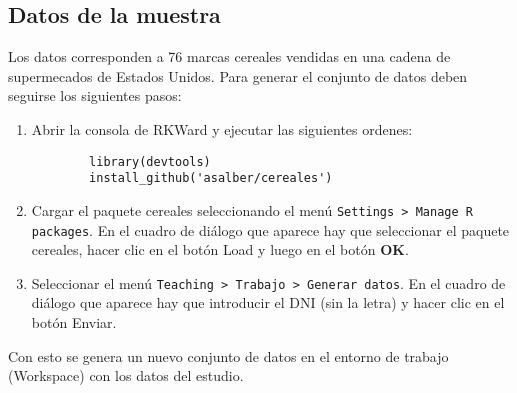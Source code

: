 \documentclass[a4paper,titlepage]{article}
\begin{document}
\subsection*{\color{blueceu}Datos de la muestra}
Los datos corresponden a 76 marcas cereales vendidas en una cadena de supermecados de Estados Unidos.
Para generar el conjunto de datos deben seguirse los siguientes pasos:
\begin{enumerate}
	\item Abrir la consola de RKWard y ejecutar las siguientes ordenes:
	\begin{verbatim}
		library(devtools)
		install_github('asalber/cereales')
	\end{verbatim}
	\item Cargar el paquete \textsf{cereales} seleccionando el menú \texttt{Settings > Manage R packages}. En el cuadro de diálogo que aparece hay que seleccionar el paquete \textsf{cereales}, hacer clic en el botón \textsf{Load} y luego en el botón \textbf{OK}.
	\item Seleccionar el menú \texttt{Teaching > Trabajo > Generar datos}. En el cuadro de diálogo que aparece hay que introducir el DNI (sin la letra) y hacer clic en el botón \textsf{Enviar}.
\end{enumerate}
Con esto se genera un nuevo conjunto de datos en el entorno de trabajo (Workspace) con los datos del estudio.
\end{document}
